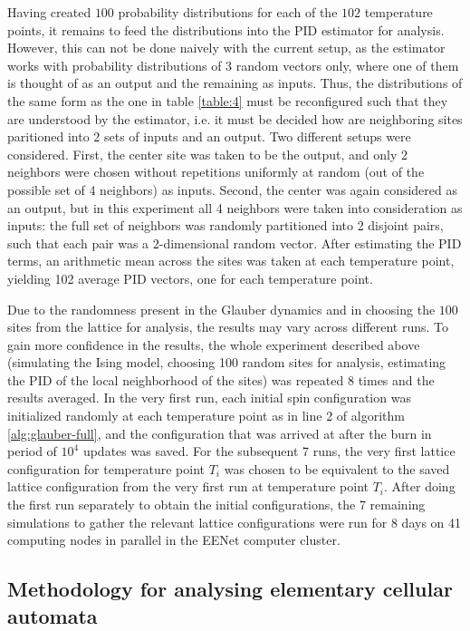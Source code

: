 \documentclass[12pt]{article}
\begin{document}
Having created $100$ probability distributions for each of the $102$ temperature points, it remains to feed the distributions into the PID estimator for analysis. However, this can not be done naively with the current setup, as the estimator works with probability distributions of 3 random vectors only, where one of them is thought of as an output and the remaining as inputs. Thus, the distributions of the same form as the one in table \ref{table:4} must be reconfigured such that they are understood by the estimator, i.e. it must be decided how are neighboring sites paritioned into 2 sets of inputs and an output. Two different setups were considered. First, the center site was taken to be the output, and only 2 neighbors were chosen without repetitions uniformly at random (out of the possible set of 4 neighbors) as inputs. Second, the center was again considered as an output, but in this experiment all 4 neighbors were taken into consideration as inputs: the full set of neighbors was randomly partitioned into 2 disjoint pairs, such that each pair was a 2-dimensional random vector. After estimating the PID terms, an arithmetic mean across the sites was taken at each temperature point, yielding 102 average PID vectors, one for each temperature point. 

Due to the randomness present in the Glauber dynamics and in choosing the $100$ sites from the lattice for analysis, the results may vary across different runs. To gain more confidence in the results, the whole experiment described above (simulating the Ising model, choosing 100 random sites for analysis, estimating the PID of the local neighborhood of the sites) was repeated 8 times and the results averaged. In the very first run, each initial spin configuration was initialized randomly at each temperature point as in line 2 of algorithm \ref{alg:glauber-full}, and the configuration that was arrived at after the burn in period of $10^4$ updates was saved. For the subsequent 7 runs, the very first lattice configuration for temperature point $T_i$ was chosen to be equivalent to the saved lattice configuration from the very first run at temperature point $T_i$. After doing the first run separately to obtain the initial configurations, the 7 remaining simulations to gather the relevant lattice configurations were run for 8 days on 41 computing nodes in parallel in the EENet computer cluster.

\subsection{Methodology for analysing elementary cellular automata}
\end{document}
